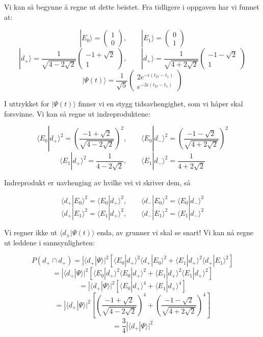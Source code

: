 \documentclass[a4paper,norsk, 10pt]{article}
\numberwithin{equation}{section}
\begin{document}
Vi kan så begynne å regne ut dette beistet. Fra tidligere i oppgaven har vi funnet at:

$$
|E_0\rangle = 
\begin{pmatrix}
1\\0
\end{pmatrix}
, \qquad
|E_1\rangle = 
\begin{pmatrix}
0\\1
\end{pmatrix}
$$
$$
|d_+\rangle = 
\frac{1}{\sqrt{4-2\sqrt{2}}}
\begin{pmatrix}
-1+\sqrt{2}\\1
\end{pmatrix}
,\qquad
|d_+\rangle = 
\frac{1}{\sqrt{4+2\sqrt{2}}}
\begin{pmatrix}
-1-\sqrt{2}\\1
\end{pmatrix}
$$
$$
|\Psi(t)\rangle = \frac{1}{\sqrt{5}}
\begin{pmatrix}
2e^{-i(t_D-t_1)} \\ e^{-3i(t_D-t_1)}
\end{pmatrix}
$$

I uttrykket for $|\Psi(t)\rangle$ finner vi en stygg tidsavhengighet, som vi håper skal forsvinne. Vi kan så regne ut indreproduktene:

$$
\langle E_0|d_+\rangle^2 = \left(\frac{-1 + \sqrt{2}}{\sqrt{4-2\sqrt{2}}}\right)^2, \qquad \langle E_0|d_-\rangle^2 = \left(\frac{-1 - \sqrt{2}}{\sqrt{4+2\sqrt{2}}}\right)^2
$$
$$
\langle E_1|d_+\rangle^2 = \frac{1}{4-2\sqrt{2}} ,\qquad \langle E_1|d_-\rangle^2 = \frac{1}{4+2\sqrt{2}} 
$$

Indreprodukt er uavhenging av hvilke vei vi skriver dem, så

$$
\langle d_+|E_0\rangle^2 = \langle E_0|d_+\rangle^2 ,\qquad \langle d_-|E_0\rangle^2 = \langle E_0|d_-\rangle^2
$$
$$
\langle d_+|E_1\rangle^2 = \langle E_1|d_+\rangle^2 ,\qquad \langle d_-|E_1\rangle^2 = \langle E_1|d_-\rangle^2
$$
\newpage

Vi regner ikke ut $\langle d_{\pm}|\Psi(t)\rangle$ enda, av grunner vi skal se snart! Vi kan nå regne ut leddene i sannsynligheten:

$$
P(d_+ \cap d_+) = |\langle d_+|\Psi\rangle|^2\left[\langle E_0|d_+\rangle^2\langle d_+|E_0\rangle^2 + \langle E_1|d_+\rangle^2\langle d_+|E_1\rangle^2\right]
$$
$$
= |\langle d_+|\Psi\rangle|^2\left[\langle E_0|d_+\rangle^2\langle E_0|d_+\rangle^2 + \langle E_1|d_+\rangle^2\langle E_1|d_+\rangle^2\right]
$$
$$
= |\langle d_+|\Psi\rangle|^2\left[\langle E_0|d_+\rangle^4 + \langle E_1|d_+\rangle^4\right]
$$
$$
= |\langle d_+|\Psi\rangle|^2\left[\left(\frac{-1+\sqrt{2}}{\sqrt{4-2\sqrt{2}}}\right)^4 + \left(\frac{-1-\sqrt{2}}{\sqrt{4+2\sqrt{2}}}\right)^4\right]
$$
$$
= \frac{3}{4}|\langle d_+|\Psi\rangle|^2
$$
\end{document}
